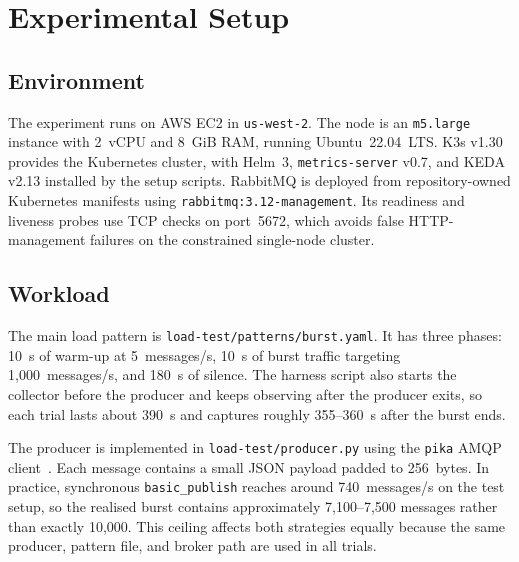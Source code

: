 \section{Experimental Setup}
\label{sec:setup}

\subsection{Environment}
\label{subsec:env}
The experiment runs on AWS EC2 in \texttt{us-west-2}. The node is an \texttt{m5.large} instance with 2~vCPU and 8~GiB RAM, running Ubuntu~22.04~LTS. K3s v1.30 provides the Kubernetes cluster, with Helm~3, \texttt{metrics-server} v0.7, and KEDA v2.13 installed by the setup scripts. RabbitMQ is deployed from repository-owned Kubernetes manifests using \texttt{rabbitmq:3.12-management}. Its readiness and liveness probes use TCP checks on port~5672, which avoids false HTTP-management failures on the constrained single-node cluster.

\subsection{Workload}
\label{subsec:workload}
The main load pattern is \texttt{load-test/patterns/burst.yaml}. It has three phases: 10~s of warm-up at 5~messages/s, 10~s of burst traffic targeting 1,000~messages/s, and 180~s of silence. The harness script also starts the collector before the producer and keeps observing after the producer exits, so each trial lasts about 390~s and captures roughly 355--360~s after the burst ends.

The producer is implemented in \texttt{load-test/producer.py} using the \texttt{pika} AMQP client~\cite{pika2024}. Each message contains a small JSON payload padded to 256~bytes. In practice, synchronous \texttt{basic\_publish} reaches around 740~messages/s on the test setup, so the realised burst contains approximately 7,100--7,500 messages rather than exactly 10,000. This ceiling affects both strategies equally because the same producer, pattern file, and broker path are used in all trials.

